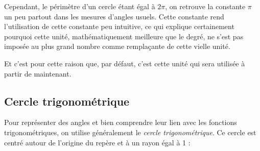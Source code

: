 \documentclass[a4paper]{article}
\begin{document}
				Cependant, le périmètre d'un cercle étant égal à $2 \pi$, 
				on retrouve la constante $\pi$ un peu partout 
				dans les mesures d'angles usuels. 
				Cette constante rend l'utilisation 
				de cette constante peu intuitive, 
				ce qui explique certainement pourquoi cette unité, 
				mathématiquement meilleure que le degré, 
				ne s'est pas imposée au plus grand nombre 
				comme remplaçante de cette vielle unité.

				Et c'est pour cette raison que,
				par défaut, c'est cette unité qui sera 
				utilisée à partir de maintenant.

			
		\subsection{Cercle trigonométrique}

			Pour représenter des angles et 
			bien comprendre leur lien avec 
			les fonctions trigonométriques, 
			on utilise généralement le \emph{cercle trigonométrique}. 
			Ce cercle est centré autour de l'origine 
			du repère et à un rayon égal à 1 :
\end{document}
